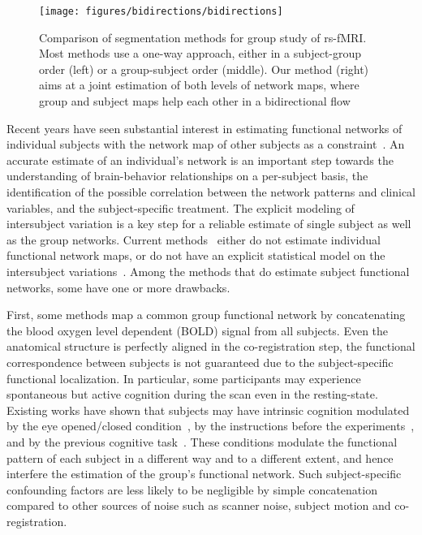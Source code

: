 \documentclass[review,authoryear]{elsarticle}
\begin{document}
\begin{figure*}[htb]
  \centering
  \texttt{[image: figures/bidirections/bidirections]}
  \caption{Comparison of segmentation methods for group study of rs-fMRI. Most
    methods use a one-way approach, either in a subject-group order (left) or a
    group-subject order (middle). Our method (right) aims at a joint estimation
    of both levels of network maps, where group and subject maps help each other
    in a bidirectional flow}
  \label{fig:bidirections}
\end{figure*}

Recent years have seen substantial interest in estimating functional networks of
individual subjects with the network map of other subjects as a
constraint~\citep{beckmann2009group, varoquaux2011multi, ng2012modeling,
  ng2012group}. An accurate estimate of an individual's network is an important
step towards the understanding of brain-behavior relationships on a per-subject
basis, the identification of the possible correlation between the network
patterns and clinical variables, and the subject-specific treatment. The
explicit modeling of intersubject variation is a key step for a reliable
estimate of single subject as well as the group networks.  Current
methods~\citep{yeo2011organization, damoiseaux2006consistent} either do not
estimate individual functional network maps, or do not have an explicit
statistical model on the intersubject variations~\citep{calhoun2001method,
  calhoun2001spatial}.  Among the methods that do estimate subject functional
networks, some have one or more drawbacks.

First, some methods map a common group functional network by concatenating the
blood oxygen level dependent (BOLD) signal from all subjects. Even the
anatomical structure is perfectly aligned in the co-registration step, the
functional correspondence between subjects is not guaranteed due to the
subject-specific functional localization. In particular, some participants may
experience spontaneous but active cognition during the scan even in the
resting-state. Existing works have shown that subjects may have intrinsic
cognition modulated by the eye opened/closed condition~\citep{van2010intrinsic},
by the instructions before the experiments~\citep{benjamin2010influence}, and by
the previous cognitive task~\citep{waites2005effect}. These conditions modulate
the functional pattern of each subject in a different way and to a different
extent, and hence interfere the estimation of the group's functional
network. Such subject-specific confounding factors are less likely to be
negligible by simple concatenation compared to other sources of noise such as
scanner noise, subject motion and co-registration.
\end{document}
